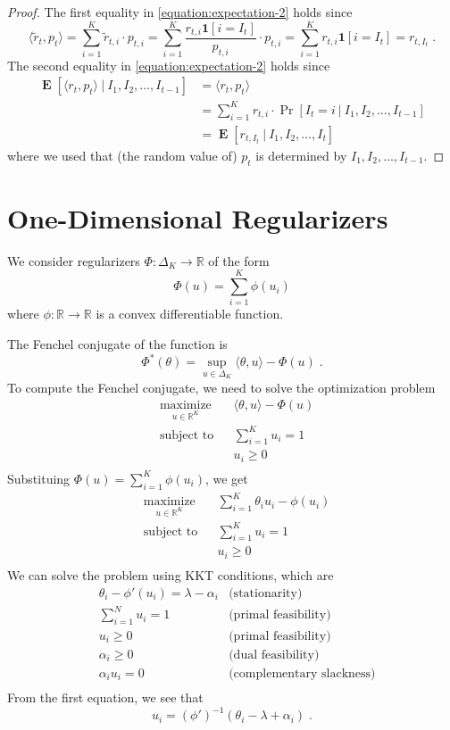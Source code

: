 \documentclass[12pt]{article}
\newcommand{\R}{\mathbb{R}}
\newcommand{\indicator}{\mathbf{1}}
\DeclareMathOperator{\Exp}{\mathbf{E}}
\begin{document}
\begin{proof}
The first equality in \eqref{equation:expectation-2} holds since
$$
\langle \widetilde r_t, p_t \rangle
= \sum_{i=1}^K \widetilde r_{t,i} \cdot p_{t,i}
= \sum_{i=1}^K \frac{r_{t,i} \indicator[i=I_t]}{p_{t,i}} \cdot p_{t,i}
= \sum_{i=1}^K r_{t,i} \indicator[i=I_t]
= r_{t,I_t} \; .
$$
The second equality in \eqref{equation:expectation-2} holds since
\begin{align*}
\Exp\left[ \langle r_t, p_t \rangle ~|~ I_1, I_2, \dots, I_{t-1} \right]
& = \langle r_t, p_t \rangle \\
& = \sum_{i=1}^K r_{t,i} \cdot \Pr\left[ I_t = i ~|~ I_1, I_2, \dots, I_{t-1} \right] \\
& = \Exp\left[r_{t,I_t} ~|~ I_1, I_2, \dots, I_t \right]
\end{align*}
where we used that (the random value of) $p_t$ is determined by $I_1, I_2, \dots, I_{t-1}$.
\end{proof}

\section{One-Dimensional Regularizers}

We consider regularizers $\Phi:\Delta_K \to \R$ of the form
$$
\Phi(u) = \sum_{i=1}^K \phi(u_i)
$$
where $\phi:\R \to \R$ is a convex differentiable function.

The Fenchel conjugate of the function is
$$
\Phi^*(\theta) = \sup_{u \in \Delta_K} \langle \theta, u \rangle - \Phi(u) \; .
$$
To compute the Fenchel conjugate, we need to solve the optimization problem
$$
\begin{aligned}
& \underset{u \in \R^K}{\text{maximize}}
& & \langle \theta, u \rangle - \Phi(u) \\
& \text{subject to} & & \sum_{i=1}^K u_i = 1 \\
& & & u_i \ge 0 \\
\end{aligned}
$$
Substituing $\Phi(u) = \sum_{i=1}^K \phi(u_i)$, we get
$$
\begin{aligned}
& \underset{u \in \R^K}{\text{maximize}}
& & \sum_{i=1}^K \theta_i u_i - \phi(u_i) \\
& \text{subject to} & & \sum_{i=1}^K u_i = 1 \\
& & & u_i \ge 0 \\
\end{aligned}
$$
We can solve the problem using KKT conditions, which are
\begin{align*}
& \theta_i - \phi'(u_i) = \lambda - \alpha_i & \text{(stationarity)} \\
& \sum_{i=1}^N u_i = 1 & \text{(primal feasibility)} \\
& u_i \ge 0 & \text{(primal feasibility)} \\
& \alpha_i \ge 0 & \text{(dual feasibility)} \\
& \alpha_i u_i = 0 & \text{(complementary slackness)} \\
\end{align*}
From the first equation, we see that
$$
u_i = (\phi')^{-1}\left(\theta_i - \lambda + \alpha_i \right) \; .
$$
\end{document}
